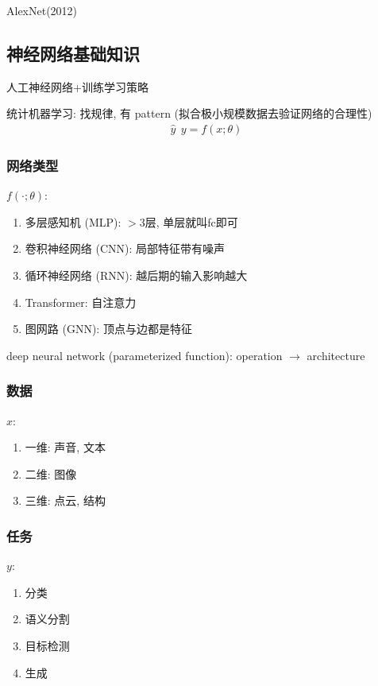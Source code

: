 AlexNet(2012)

\subsection{神经网络基础知识}
人工神经网络+训练学习策略

统计机器学习: 找规律, 有 pattern (拟合极小规模数据去验证网络的合理性)
\begin{align*}
    \hat{y}\ \ y=f(x;\theta)
\end{align*}

\subsubsection{网络类型}
$f(\cdot; \theta)$:
\begin{enumerate}
    \item 多层感知机 (MLP): $>3$层, 单层就叫fc即可
    \item 卷积神经网络 (CNN): 局部特征带有噪声
    \item 循环神经网络 (RNN): 越后期的输入影响越大
    \item Transformer: 自注意力 %
    \item 图网路 (GNN): 顶点与边都是特征
\end{enumerate}

deep neural network (parameterized function): operation $\rightarrow$ architecture

\subsubsection{数据}
$x$:
\begin{enumerate}
    \item 一维: 声音, 文本
    \item 二维: 图像
    \item 三维: 点云, 结构
\end{enumerate}

\subsubsection{任务}
$y$:
\begin{enumerate}
    \item 分类
    \item 语义分割
    \item 目标检测
    \item 生成
\end{enumerate}

